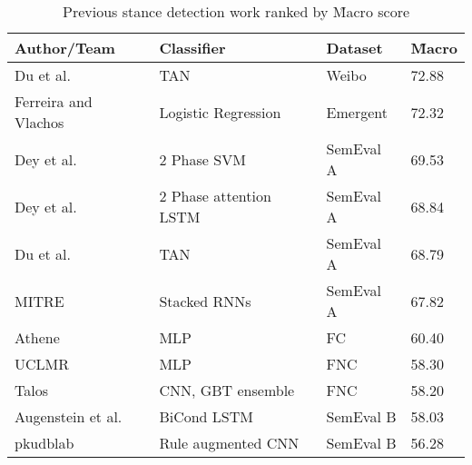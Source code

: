 \documentclass[Dissertation.tex]{subfiles}
\begin{document}
\begin{table}[]
	\caption{Previous stance detection work ranked by \f{Macro} score}
	\label{tab:reviewResults}
	\begin{tabularx}{\textwidth}{p{5cm}Xp{2.5cm}p{1cm}}
		\toprule
		Author/Team          & Classifier                               & Dataset             & \f{Macro}  \\ \midrule
		Du et al. \cite{duStanceClassificationTargetspecific}            & TAN                                      & Weibo               & 72.88                            \\
		Ferreira and Vlachos \cite{ferreiraEmergentNovelDataset2016} & Logistic Regression                      & Emergent            & 72.32                            \\
		Dey et al.\cite{deyTwitterStanceDetection2017}           & 2 Phase SVM                              & SemEval A      & 69.53                            \\
		Dey et al. \cite{deyTopicalStanceDetection2018}           & 2 Phase attention LSTM                   & SemEval A      & 68.84                            \\
		Du et al. \cite{duStanceClassificationTargetspecific}            & TAN                                      & SemEval A      & 68.79                            \\
		MITRE \cite{zarrellaMITRESemEval2016Task2016}                & Stacked RNNs                             & SemEval A      & 67.82                            \\
		Athene \cite{hanselowskiRetrospectiveAnalysisFake2018}               & MLP                                      & FC & 60.40                            \\
		UCLMR \cite{riedelSimpleToughtobeatBaseline2017}                & MLP                                      & FNC & 58.30                            \\
		Talos \cite{largentTalosTargetsDisinformation}                & CNN, GBT ensemble                        & FNC & 58.20                            \\
		Augenstein et al. \cite{augensteinStanceDetectionBidirectional2016}    & BiCond LSTM & SemEval B      & 58.03                            \\
		pkudblab \cite{weiPkudblabSemEval2016Task2016}           & Rule augmented CNN                       & SemEval B      & 56.28                            \\ \bottomrule
	\end{tabularx}
\end{table}
\end{document}
